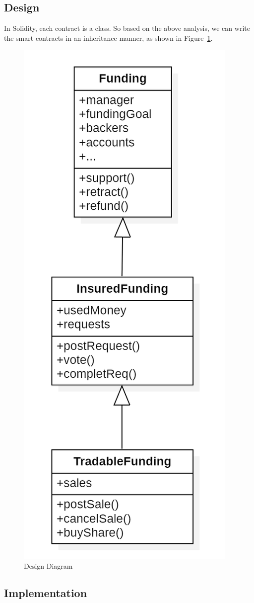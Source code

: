 \documentclass{article}
\begin{document}
\subsection{Design}
In Solidity, each contract is a class. So based on the above analysis, we can write the smart contracts in an inheritance manner, as shown in Figure~\ref{fig:design}.

\begin{figure}[htbp]
    \centering
    \includegraphics[width=0.3\linewidth]{fig/design.png}
    \caption{Design Diagram}
    \label{fig:design}
\end{figure}

\subsection{Implementation}
\end{document}

